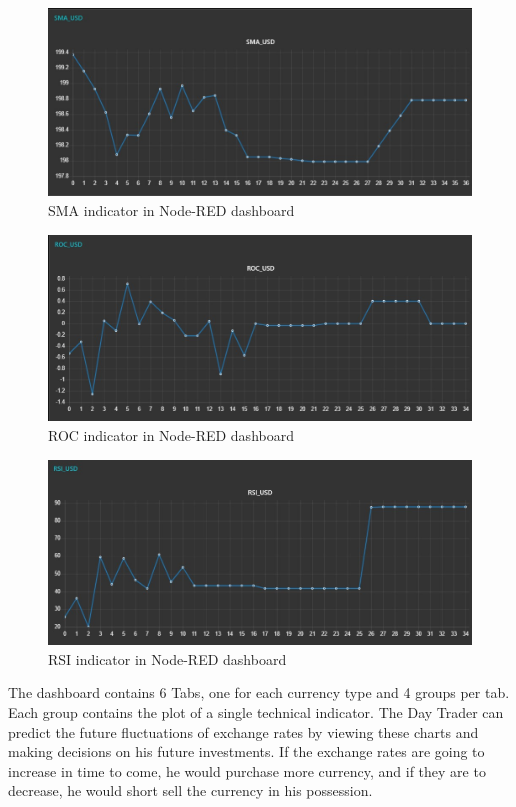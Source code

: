 \begin{figure}[H]
    \centering
      \includegraphics[width=1\textwidth]{images/SMA.jpg}
    \caption{SMA indicator in Node-RED dashboard}
    \label{fig:SMA}
\end{figure}

\begin{figure}[H]
    \centering
      \includegraphics[width=1\textwidth]{images/ROC.jpg}
    \caption{ROC indicator in Node-RED dashboard}
    \label{fig:ROC}
\end{figure}

\begin{figure}[H]
    \centering
      \includegraphics[width=1\textwidth]{images/RSI.jpg}
    \caption{RSI indicator in Node-RED dashboard}
    \label{fig:RSI}
\end{figure}

The dashboard contains 6 Tabs, one for each currency type and 4 groups per tab. Each group contains the plot of  a single technical indicator. The Day Trader can predict the future fluctuations of exchange rates by viewing these charts and making decisions on his future investments. If the exchange rates are going to increase in time to come, he would purchase more currency, and if they are to decrease, he would short sell the currency in his possession.
